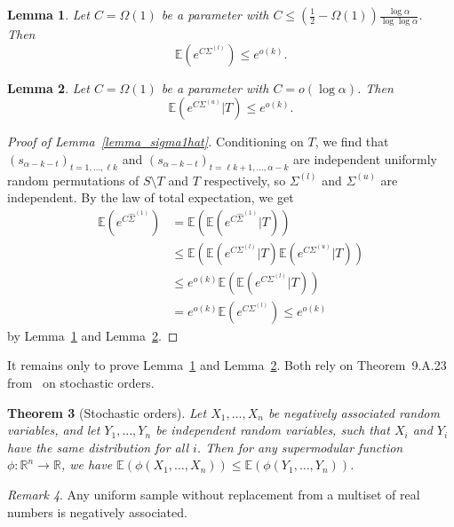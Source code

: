 \documentclass{article}
\theoremstyle{plain}
\newtheorem{theorem}{Theorem}[section]
\theoremstyle{remark}
\newtheorem{remark}[theorem]{Remark}
\theoremstyle{plain}
\newtheorem{lemma}[theorem]{Lemma}
\numberwithin{equation}{section}
\begin{document}
	\begin{lemma}\label{lemma_sigmal}
		Let $C=\Omega(1)$ be a parameter with $C\leq(\frac12-\Omega(1))\frac{\log\alpha}{\log\log\alpha}$. Then $$\mathbb{E}(e^{C\Sigma^{(l)}})\leq e^{o(k)}.$$
	\end{lemma}
	
	\begin{lemma}\label{lemma_sigmau}
		Let $C=\Omega(1)$ be a parameter with $C=o(\log\alpha)$. Then $$\mathbb{E}(e^{C\Sigma^{(u)}}|T)\leq e^{o(k)}.$$
	\end{lemma}
	
	\begin{proof}[Proof of Lemma~\ref{lemma_sigma1hat}]
		Conditioning on $T$, we find that $(s_{\alpha-k-t})_{t=1,\ldots,\ell k}$ and $(s_{\alpha-k-t})_{t=\ell k+1,\ldots,\alpha-k}$ are independent uniformly random permutations of $S\setminus T$ and $T$ respectively, so $\Sigma^{(l)}$ and $\Sigma^{(u)}$ are independent. By the law of total expectation, we get
		\begin{align}
			\mathbb{E}(e^{C\hat{\Sigma}^{(1)}})
			&=\mathbb{E}(\mathbb{E}(e^{C\hat{\Sigma}^{(1)}}|T))
			\\&\leq\mathbb{E}(\mathbb{E}(e^{C\Sigma^{(l)}}|T)\mathbb{E}(e^{C\Sigma^{(u)}}|T))
			\\&\leq e^{o(k)}\mathbb{E}(\mathbb{E}(e^{C\Sigma^{(l)}}|T))
			\\&=e^{o(k)}\mathbb{E}(e^{C\Sigma^{(l)}})\leq e^{o(k)}
		\end{align}
		by Lemma~\ref{lemma_sigmal} and Lemma~\ref{lemma_sigmau}.
	\end{proof}
	
	It remains only to prove Lemma~\ref{lemma_sigmal} and Lemma~\ref{lemma_sigmau}. Both rely on Theorem~9.A.23 from~\cite{BookSO} on stochastic orders.
	
	\begin{theorem}[Stochastic orders]\label{theorem_so}
		Let $X_1,\ldots,X_n$ be negatively associated random variables, and let $Y_1,\ldots,Y_n$ be independent random variables, such that $X_i$ and $Y_i$ have the same distribution for all $i$. Then for any supermodular function $\phi:\mathbb{R}^n\to\mathbb{R}$, we have $\mathbb{E}(\phi(X_1,\ldots,X_n))\leq\mathbb{E}(\phi(Y_1,\ldots,Y_n))$.
	\end{theorem}
	
	\begin{remark}
		Any uniform sample without replacement from a multiset of real numbers is negatively associated.
	\end{remark}
	
\end{document}
